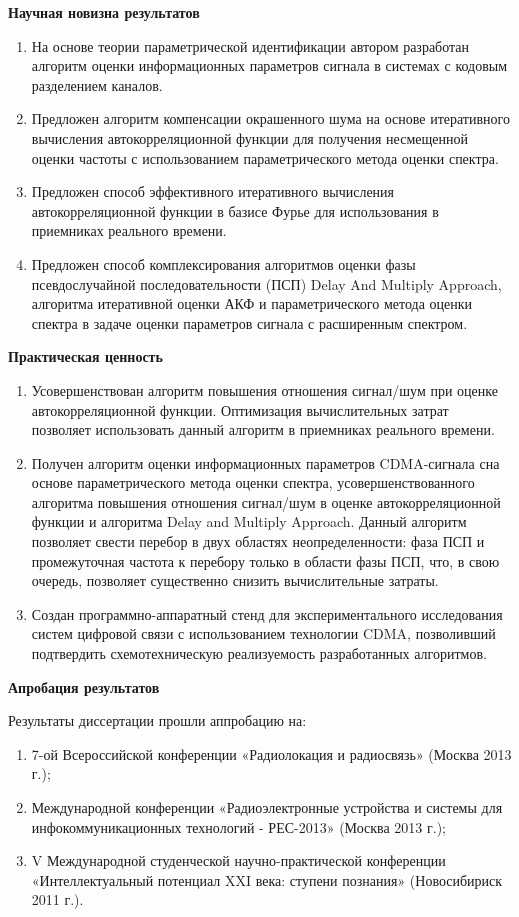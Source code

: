 {\bf{Научная новизна результатов}}
\begin{enumerate}
	\item{На основе теории параметрической идентификации автором разработан алгоритм оценки информационных параметров сигнала в системах с кодовым разделением каналов.}
	\item{Предложен алгоритм компенсации окрашенного шума на основе итеративного вычисления автокорреляционной функции для
		получения несмещенной оценки частоты с использованием параметрического метода оценки спектра.}
	\item{Предложен способ эффективного итеративного вычисления автокорреляционной функции в базисе Фурье для использования в
		приемниках реального времени.}
	\item{Предложен способ комплексирования алгоритмов оценки фазы псевдослучайной последовательности (ПСП) Delay And Multiply Approach, алгоритма итеративной оценки АКФ и
		параметрического метода оценки спектра в задаче оценки параметров сигнала с расширенным спектром.}
\end{enumerate}

{\bf{Практическая ценность}}
\begin{enumerate}
	\item {Усовершенствован алгоритм повышения отношения сигнал/шум при оценке автокорреляционной функции. Оптимизация вычислительных затрат позволяет использовать
		данный алгоритм в приемниках реального времени.}
	\item {Получен алгоритм оценки информационных параметров CDMA-сигнала сна основе параметрического метода оценки спектра, усовершенствованного
		алгоритма повышения отношения сигнал/шум в оценке автокорреляционной функции и алгоритма Delay and Multiply Approach. Данный алгоритм
		позволяет свести перебор в двух областях неопределенности: фаза ПСП и промежуточная частота к перебору только в области фазы ПСП,
		что, в свою очередь, позволяет
		существенно снизить вычислительные затраты.}
	\item {Создан программно-аппаратный стенд для экспериментального исследования систем цифровой связи с использованием технологии CDMA,
		позволивший подтвердить схемотехническую реализуемость разработанных алгоритмов.}
\end{enumerate}

{\bf{Апробация результатов}}

Результаты диссертации прошли аппробацию на:
\begin{enumerate}
	\item 7-ой Всероссийской конференции «Радиолокация и радиосвязь» (Москва 2013 г.);
	\item Международной конференции «Радиоэлектронные устройства и системы для инфокоммуникационных технологий - РЕС-2013» (Москва 2013 г.);
	\item V Международной студенческой научно-практической конференции «Интеллектуальный потенциал XXI века: ступени познания» (Новосибириск 2011 г.).
\end{enumerate}

